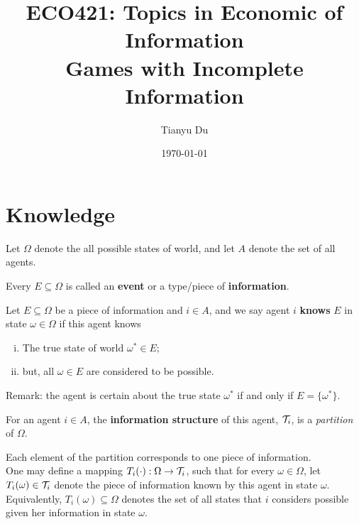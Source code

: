 \documentclass{article}
\title{ECO421: Topics in Economic of Information \\ \large Games with Incomplete Information}
\date{\today}
\author{Tianyu Du}
\begin{document}
    \maketitle
    \tableofcontents
    \newpage
    
    \section{Knowledge}
    \begin{notation}
    	Let $\Omega$ denote the all possible states of world, and let $A$ denote the set of all agents.
    \end{notation}
	
	\begin{definition}
		Every $E \subseteq \Omega$ is called an \textbf{event} or a type/piece of \textbf{information}.
	\end{definition}
	
    \begin{definition}
    	Let $E \subseteq \Omega$ be a piece of information and $i \in A$, and we say agent $i$ \textbf{knows} $E$ in state $\omega \in \Omega$ if this agent knows
    	\begin{enumerate}[(i)]
    		\item The true state of world $\omega^* \in E$;
    		\item but, all $\omega \in E$ are considered to be possible.
    	\end{enumerate}
    	Remark: the agent is certain about the true state $\omega^*$ if and only if $E = \{\omega^*\}$.
    \end{definition}
    
    \begin{definition}
    	For an agent $i \in A$, the \textbf{information structure} of this agent, $\mathcal{{T}}_i$, is a \emph{partition} of $\Omega$.
    \end{definition}
    
    \begin{notation}
    	Each element of the partition corresponds to one piece of information. \\
    	One may define a mapping $T_i(\cdot): \Omega \to \mathcal{{T}}_i$, such that for every $\omega \in \Omega$, let $T_i(\omega) \in \mathcal{{T}}_i$ denote the piece of information known by this agent in state $\omega$. \\
    	Equivalently, $T_i(\omega) \subseteq \Omega$ denotes the set of all states that $i$ considers possible given her information in state $\omega$.
    \end{notation}
    
\end{document}
